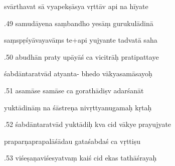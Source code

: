 \documentclass[article,12pt,a4paper]{memoir}%
\newcounter{parCount}
\begin{document}
	  
	  \pstart \leavevmode%
	svārthavat sā vyapekṣāsya vṛttāv api na hīyate 
	{}
	\pend%
      

	  
	  \pstart {}.49 samudāyena saṃbandho yesāṃ gurukulādinā 
	{}
	\pend%
      

	  
	  \pstart \leavevmode%
	saṃspṛśyāvayavāṃs te+api yujyante tadvatā saha 
	{}
	\pend%
      

	  
	  \pstart {}.50 abudhān praty upāyāś ca vicitrāḥ pratipattaye 
	{}
	\pend%
      

	  
	  \pstart \leavevmode%
	śabdāntaratvād atyanta- bhedo vākyasamāsayoḥ 
	{}
	\pend%
      

	  
	  \pstart {}.51 asamāse samāse ca gorathādiṣv adarśanāt 
	{}
	\pend%
      

	  
	  \pstart \leavevmode%
	yuktādināṃ na śāstreṇa nivṛttyanugamaḥ kṛtaḥ 
	{}
	\pend%
      

	  
	  \pstart {}.52 śabdāntaratvād yuktādiḥ kva cid vākye prayujyate 
	{}
	\pend%
      

	  
	  \pstart \leavevmode%
	praparṇaprapalāśādau gataśabdaś ca vṛttiṣu 
	{}
	\pend%
      

	  
	  \pstart {}.53 viśeṣaṇaviśesyatvaṃ kaiś cid ekas tathāśrayaḥ 
	{}
	\pend%
      
\end{document}
